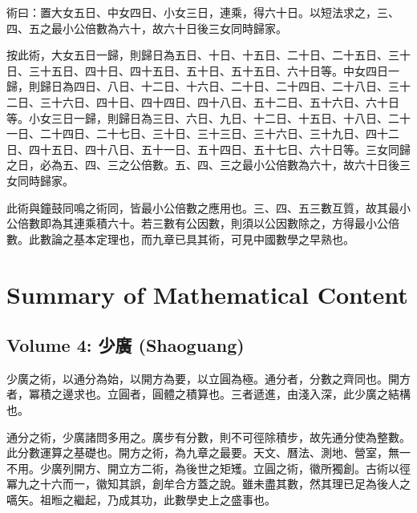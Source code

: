 \documentclass[11pt,a4paper]{article}
\newcommand{\zh}[1]{#1}
\begin{document}
\begin{method}[\zh{術}]
\zh{%
術曰：置大女五日、中女四日、小女三日，連乘，得六十日。以短法求之，三、四、五之最小公倍數為六十，故六十日後三女同時歸家。
}
\end{method}

\begin{commentary}[\zh{劉徽注}]
\zh{%
按此術，大女五日一歸，則歸日為五日、十日、十五日、二十日、二十五日、三十日、三十五日、四十日、四十五日、五十日、五十五日、六十日等。中女四日一歸，則歸日為四日、八日、十二日、十六日、二十日、二十四日、二十八日、三十二日、三十六日、四十日、四十四日、四十八日、五十二日、五十六日、六十日等。小女三日一歸，則歸日為三日、六日、九日、十二日、十五日、十八日、二十一日、二十四日、二十七日、三十日、三十三日、三十六日、三十九日、四十二日、四十五日、四十八日、五十一日、五十四日、五十七日、六十日等。三女同歸之日，必為五、四、三之公倍數。五、四、三之最小公倍數為六十，故六十日後三女同時歸家。

此術與鐘鼓同鳴之術同，皆最小公倍數之應用也。三、四、五三數互質，故其最小公倍數即為其連乘積六十。若三數有公因數，則須以公因數除之，方得最小公倍數。此數論之基本定理也，而九章已具其術，可見中國數學之早熟也。
}
\end{commentary}

\newpage

\section{Summary of Mathematical Content}

\subsection*{Volume 4: \zh{少廣} (Shaoguang)}

\begin{commentary}[\zh{劉徽注·少廣章總論}]
\zh{%
少廣之術，以通分為始，以開方為要，以立圓為極。通分者，分數之齊同也。開方者，冪積之邊求也。立圓者，圓體之積算也。三者遞進，由淺入深，此少廣之結構也。

通分之術，少廣諸問多用之。廣步有分數，則不可徑除積步，故先通分使為整數。此分數運算之基礎也。開方之術，為九章之最要。天文、曆法、測地、營室，無一不用。少廣列開方、開立方二術，為後世之矩矱。立圓之術，徽所獨創。古術以徑冪九之十六而一，徽知其誤，創牟合方蓋之說。雖未盡其數，然其理已足為後人之嚆矢。祖暅之繼起，乃成其功，此數學史上之盛事也。
}
\end{commentary}
\end{document}
